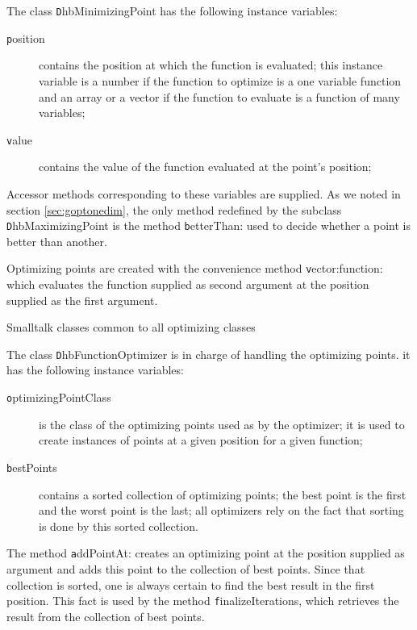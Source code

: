 \noindent The class {\texttt DhbMinimizingPoint} has the following
instance variables:
\begin{description}
  \item[\texttt position] contains the position at which the function
  is evaluated; this instance variable is a number if the function
  to optimize is a one variable function and an array or a vector
  if the function to evaluate is a function of many variables;
  \item[\texttt value] contains the value of the function evaluated at the point's position;
\end{description}
Accessor methods corresponding to these variables are supplied. As
we noted in section \ref{sec:goptonedim}, the only method
redefined by the subclass {\texttt DhbMaximizingPoint} is the method
{\texttt betterThan:} used to decide whether a point is better than
another.

Optimizing points are created with the convenience method {\texttt
vector:function:} which evaluates the function supplied as second
argument at the position supplied as the first argument.
\begin{listing} Smalltalk classes common to all optimizing classes \label{ls:optimizerCommon}


\end{listing}

The class {\texttt DhbFunctionOptimizer} is in charge of handling the
optimizing points. it has the following instance variables:
\begin{description}
  \item[\texttt optimizingPointClass] is the class of the optimizing
  points used as  by the optimizer; it is used
  to create instances of points at a given position for a given
  function;
  \item[\texttt bestPoints] contains a sorted collection of optimizing
  points; the best point is the first and the worst point is the
  last; all optimizers rely on the fact that sorting is done by this sorted collection.
\end{description}
The method {\texttt addPointAt:} creates an optimizing point at the
position supplied as argument and adds this point to the
collection of best points. Since that collection is sorted, one is
always certain to find the best result in the first position. This
fact is used by the method {\texttt finalizeIterations}, which
retrieves the result from the collection of best points.

